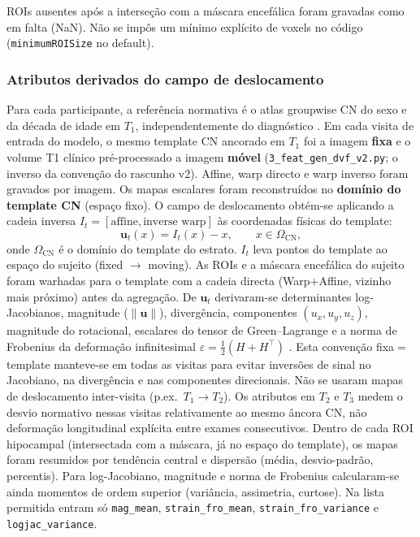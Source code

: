 \documentclass[review]{elsarticle}
\newcommand{\code}[1]{\texttt{#1}}
\begin{document}
	ROIs ausentes após a interseção com a máscara encefálica foram gravadas como em falta (NaN). Não se impôs um mínimo explícito de voxels no código (\code{minimumROISize} no default).
	
	\subsubsection{Atributos derivados do campo de deslocamento}\label{sec:displacement-features}
	
	Para cada participante, a referência normativa é o atlas groupwise CN do sexo e da década de idade em $T_1$, independentemente do diagnóstico \cite{wyman-2013}. Em cada visita de entrada do modelo, o mesmo template CN ancorado em $T_1$ foi a imagem \textbf{fixa} e o volume T1 clínico pré-processado a imagem \textbf{móvel} (\code{3\_feat\_gen\_dvf\_v2.py}; o inverso da convenção do rascunho v2). Affine, warp directo e warp inverso foram gravados por imagem.
		Os mapas escalares foram reconstruídos no \textbf{domínio do template CN} (espaço fixo). O campo de deslocamento obtém-se aplicando a cadeia inversa $I_t=[\text{affine},\text{inverse warp}]$ às coordenadas físicas do template:
		\begin{equation}
			\mathbf{u}_t(x)=I_t(x)-x,\qquad x\in\Omega_{\mathrm{CN}},
			\label{eq:dvf-template}
		\end{equation}
	onde $\Omega_{\mathrm{CN}}$ é o domínio do template do estrato. $I_t$ leva pontos do template ao espaço do sujeito (fixed $\rightarrow$ moving). As ROIs e a máscara encefálica do sujeito foram warhadas para o template com a cadeia directa (Warp$+$Affine, vizinho mais próximo) antes da agregação.
	De $\mathbf{u}_t$ derivaram-se determinantes log-Jacobianos, magnitude ($\|\mathbf{u}\|$), divergência, componentes $(u_x,u_y,u_z)$, magnitude do rotacional, escalares do tensor de Green--Lagrange e a norma de Frobenius da deformação infinitesimal $\varepsilon=\tfrac12(H+H^{\top})$ \cite{bouke-2023}. Esta convenção fixa$=$template manteve-se em todas as visitas para evitar inversões de sinal no Jacobiano, na divergência e nas componentes direcionais.
	Não se usaram mapas de deslocamento inter-visita (p.ex.\ $T_1\rightarrow T_2$). Os atributos em $T_2$ e $T_3$ medem o desvio normativo nessas visitas relativamente ao mesmo âncora CN, não deformação longitudinal explícita entre exames consecutivos.
	Dentro de cada ROI hipocampal (intersectada com a máscara, já no espaço do template), os mapas foram resumidos por tendência central e dispersão (média, desvio-padrão, percentis). Para log-Jacobiano, magnitude e norma de Frobenius calcularam-se ainda momentos de ordem superior (variância, assimetria, curtose).
	Na lista permitida entram só \code{mag\_mean}, \code{strain\_fro\_mean}, \code{strain\_fro\_variance} e \code{logjac\_variance}.
	
\end{document}
